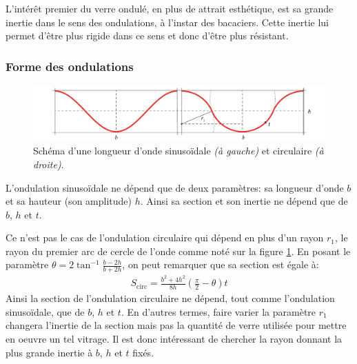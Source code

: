 \documentclass[11pt,titlepage]{article}
\begin{document}
L'intérêt premier du verre ondulé, en plus de attrait esthétique, est sa grande inertie dans le sens des ondulations, à l'instar des bacaciers. Cette inertie lui permet d'être plus rigide dans ce sens et donc d'être plus résistant.

\subsubsection{Forme des ondulations}
\begin{figure}[H]
    \centering
    \includegraphics[width=\linewidth]{img/ondul/circ.pdf}
    \caption{Schéma d'une longueur d'onde sinusoïdale \textit{(à gauche)} et circulaire \textit{(à droite)}.}
    \label{fig:ondcirc}
\end{figure}
L'ondulation sinusoïdale ne dépend que de deux paramètres: sa longueur d'onde $b$ et sa hauteur (son amplitude) $h$. Ainsi sa section et son inertie ne dépend que de $b$, $h$ et $t$.

Ce n'est pas le cas de l'ondulation circulaire qui dépend en plus d'un rayon $r_1$, le rayon du premier arc de cercle de l'onde comme noté sur la figure \ref{fig:ondcirc}. En posant le paramètre $\theta = 2 \tan^{-1} \frac{b-2h}{b+2h}$, on peut remarquer que sa section est égale à:
\begin{align}
    S_{\text{circ}} = \frac{b^2+4h^2}{8h} \left ( \frac{\pi}{2} - \theta\right )t
\end{align}
Ainsi la section de l'ondulation circulaire ne dépend, tout comme l'ondulation sinusoïdale, que de $b$, $h$ et $t$. En d'autres termes, faire varier la paramètre $r_1$ changera l'inertie de la section mais pas la quantité de verre utilisée pour mettre en oeuvre un tel vitrage.  Il est donc intéressant de chercher la rayon donnant la plus grande inertie à $b$, $h$ et $t$ fixés.
\end{document}
